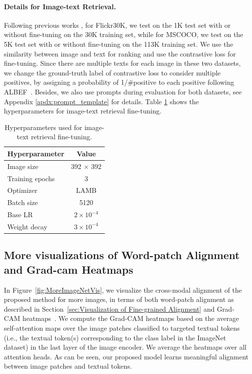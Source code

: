 \paragraph{Details for Image-text Retrieval.} Following previous works \citep{jia2021scaling,li2021align}, for Flickr30K, we test on the 1K test set with or without fine-tuning on the 30K training set, while for MSCOCO, we test on the 5K test set with or without fine-tuning on the 113K training set.  We use the similarity between image and text for ranking and use the contrastive loss for fine-tuning. Since there are multiple texts for each image in these two datasets, we change the ground-truth label of contrastive loss to consider multiple positives, by assigning a probability of 1/\#positive to each positive following ALBEF~\citep{li2021align}. Besides, we also use prompts during evaluation for both datasets, see Appendix \ref{apdx:prompt_template} for details. Table \ref{tab:hyperparameter_image_text_retrieval} shows the hyperparameters for image-text retrieval fine-tuning.

\begin{table}[htbp]
    \centering
    \caption{Hyperparameters used for image-text retrieval fine-tuning.}
    \label{tab:hyperparameter_image_text_retrieval}
    \begin{tabular}{l|c}
        \toprule Hyperparameter & Value \\
        \midrule
        Image size & 392 $\times$ 392 \\
        Training epochs & 3 \\
        Optimizer & LAMB \\ 
        Batch size & 5120 \\
        Base LR & $2 \times 10^{-4}$ \\
        Weight decay & $3 \times 10^{-4}$ \\
        \bottomrule
    \end{tabular}
\end{table}


\subsection{More visualizations of Word-patch Alignment and Grad-cam Heatmaps}
\label{apdx:more_vis}
In Figure~\ref{fig:MoreImageNetVis}, we visualize the cross-modal alignment of the proposed method for more images, in terms of
both word-patch alignment as described in Section~\ref{sec:Visualization of Fine-grained Alignment} and Grad-CAM heatmaps~\citep{selvaraju2017grad}.
We compute the Grad-CAM heatmaps based on the average self-attention maps over the image patches classified to targeted textual tokens (i.e., the textual token(s) corresponding to the class label in the ImageNet dataset) in the last layer of the image encoder. We average the heatmaps over all attention heads.
As can be seen, our proposed model learns meaningful alignment between image patches and textual tokens.


